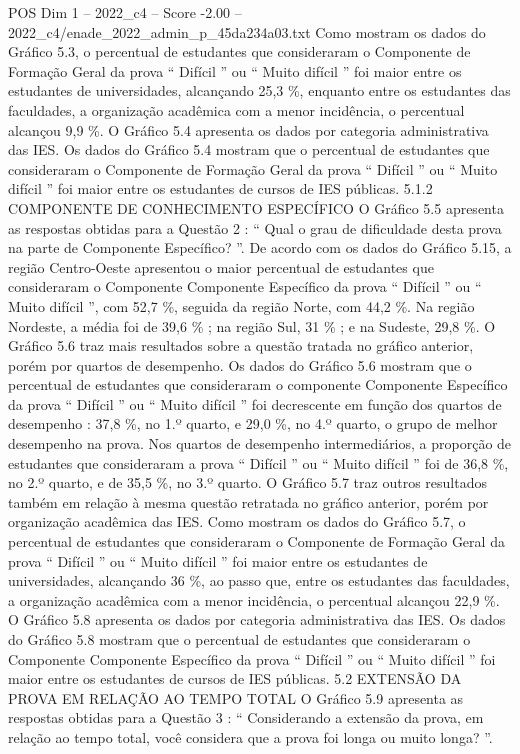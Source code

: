 \begin{textsample}{POS Dim 1 – 2022\_c4 – Score -2.00 – 2022\_c4/enade\_2022\_admin\_p\_45da234a03.txt}
Como mostram os dados do Gráfico 5.3, o percentual de estudantes que consideraram o Componente de Formação Geral da prova “ Difícil ” ou “ Muito difícil ” foi maior entre os estudantes de universidades, alcançando 25,3 \%, enquanto entre os estudantes das faculdades, a organização acadêmica com a menor incidência, o percentual alcançou 9,9 \%.
O Gráfico 5.4 apresenta os dados por categoria administrativa das IES.
Os dados do Gráfico 5.4 mostram que o percentual de estudantes que consideraram o Componente de Formação Geral da prova “ Difícil ” ou “ Muito difícil ” foi maior entre os estudantes de cursos de IES públicas. 5.1.2 COMPONENTE DE CONHECIMENTO ESPECÍFICO O Gráfico 5.5 apresenta as respostas obtidas para a Questão 2 : “ Qual o grau de dificuldade desta prova na parte de Componente Específico? ”.
De acordo com os dados do Gráfico 5.15, a região Centro-Oeste apresentou o maior percentual de estudantes que consideraram o Componente Componente Específico da prova “ Difícil ” ou “ Muito difícil ”, com 52,7 \%, seguida da região Norte, com 44,2 \%.
Na região Nordeste, a média foi de 39,6 \% ; na região Sul, 31 \% ; e na Sudeste, 29,8 \%.
O Gráfico 5.6 traz mais resultados sobre a questão tratada no gráfico anterior, porém por quartos de desempenho.
Os dados do Gráfico 5.6 mostram que o percentual de estudantes que consideraram o componente Componente Específico da prova “ Difícil ” ou “ Muito difícil ” foi decrescente em função dos quartos de desempenho : 37,8 \%, no 1.º quarto, e 29,0 \%, no 4.º quarto, o grupo de melhor desempenho na prova.
Nos quartos de desempenho intermediários, a proporção de estudantes que consideraram a prova “ Difícil ” ou “ Muito difícil ” foi de 36,8 \%, no 2.º quarto, e de 35,5 \%, no 3.º quarto.
O Gráfico 5.7 traz outros resultados também em relação à mesma questão retratada no gráfico anterior, porém por organização acadêmica das IES.
Como mostram os dados do Gráfico 5.7, o percentual de estudantes que consideraram o Componente de Formação Geral da prova “ Difícil ” ou “ Muito difícil ” foi maior entre os estudantes de universidades, alcançando 36 \%, ao passo que, entre os estudantes das faculdades, a organização acadêmica com a menor incidência, o percentual alcançou 22,9 \%.
O Gráfico 5.8 apresenta os dados por categoria administrativa das IES.
Os dados do Gráfico 5.8 mostram que o percentual de estudantes que consideraram o Componente Componente Específico da prova “ Difícil ” ou “ Muito difícil ” foi maior entre os estudantes de cursos de IES públicas. 5.2 EXTENSÃO DA PROVA EM RELAÇÃO AO TEMPO TOTAL O Gráfico 5.9 apresenta as respostas obtidas para a Questão 3 : “ Considerando a extensão da prova, em relação ao tempo total, você considera que a prova foi longa ou muito longa? ”.

\end{textsample}
